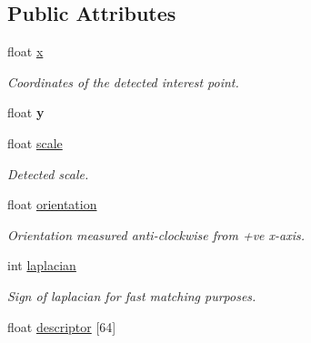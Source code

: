 \subsection*{Public Attributes}
\begin{DoxyCompactItemize}
\item 
\hypertarget{classIpoint_a3bbd5fa4ec53e4e871ddffe3b952fddd}{float \hyperlink{classIpoint_a3bbd5fa4ec53e4e871ddffe3b952fddd}{x}}\label{classIpoint_a3bbd5fa4ec53e4e871ddffe3b952fddd}

\begin{DoxyCompactList}\small\item\em Coordinates of the detected interest point. \end{DoxyCompactList}\item 
\hypertarget{classIpoint_a5c80f97ba9ca511ef36ed8e12cf08064}{float {\bfseries y}}\label{classIpoint_a5c80f97ba9ca511ef36ed8e12cf08064}

\item 
\hypertarget{classIpoint_a50018658330bba7a782ac53deb6e2b71}{float \hyperlink{classIpoint_a50018658330bba7a782ac53deb6e2b71}{scale}}\label{classIpoint_a50018658330bba7a782ac53deb6e2b71}

\begin{DoxyCompactList}\small\item\em Detected scale. \end{DoxyCompactList}\item 
\hypertarget{classIpoint_a1b052f994fd207d00ba4e5bde258d206}{float \hyperlink{classIpoint_a1b052f994fd207d00ba4e5bde258d206}{orientation}}\label{classIpoint_a1b052f994fd207d00ba4e5bde258d206}

\begin{DoxyCompactList}\small\item\em Orientation measured anti-\/clockwise from +ve x-\/axis. \end{DoxyCompactList}\item 
\hypertarget{classIpoint_a2daff54c9aa31559c6517971d924b294}{int \hyperlink{classIpoint_a2daff54c9aa31559c6517971d924b294}{laplacian}}\label{classIpoint_a2daff54c9aa31559c6517971d924b294}

\begin{DoxyCompactList}\small\item\em Sign of laplacian for fast matching purposes. \end{DoxyCompactList}\item 
\hypertarget{classIpoint_a84e5c7ff7bfd4cef2692f2939e76398f}{float \hyperlink{classIpoint_a84e5c7ff7bfd4cef2692f2939e76398f}{descriptor} \mbox{[}64\mbox{]}}\label{classIpoint_a84e5c7ff7bfd4cef2692f2939e76398f}


\end{DoxyCompactItemize}
